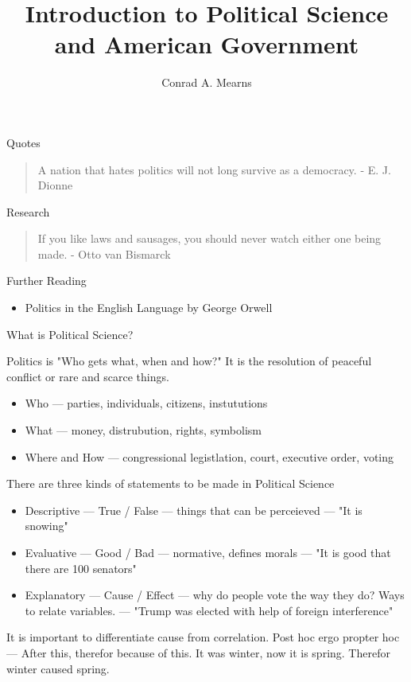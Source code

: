 \documentclass{article}
\title{Introduction to Political Science and American Government}
\author{Conrad A. Mearns}
\begin{document}
\maketitle

\noindent
\Large Quotes\\
\normalsize
\begin{quote}
  A nation that hates politics will not long survive as a democracy. - E. J. Dionne
\end{quote}

Research

\begin{quote}
  If you like laws and sausages, you should never watch either one being made. - Otto van Bismarck
\end{quote}

\noindent
\Large Further Reading\\
\normalsize
\begin{itemize}
  \item Politics in the English Language by George Orwell
\end{itemize}

\noindent
\Large
What is Political Science?\\
\normalsize

\noindent
Politics is "Who gets what, when and how?" It is the resolution of peaceful conflict or rare and scarce things.
\begin{itemize}
  \item Who --- parties, individuals, citizens, instututions
  \item What --- money, distrubution, rights, symbolism
  \item Where and How --- congressional legistlation, court, executive order, voting
\end{itemize}

\noindent
There are three kinds of statements to be made in Political Science
\begin{itemize}
  \item Descriptive --- True / False --- things that can be perceieved --- "It is snowing"
  \item Evaluative --- Good / Bad --- normative, defines morals --- "It is good that there are 100 senators"
  \item Explanatory --- Cause / Effect --- why do people vote the way they do? Ways to relate variables. --- "Trump was elected with help of foreign interference"
\end{itemize}

\noindent
It is important to differentiate cause from correlation. Post hoc ergo propter hoc --- After this, therefor because of this. It was winter, now it is spring. Therefor winter caused spring.
\end{document}
